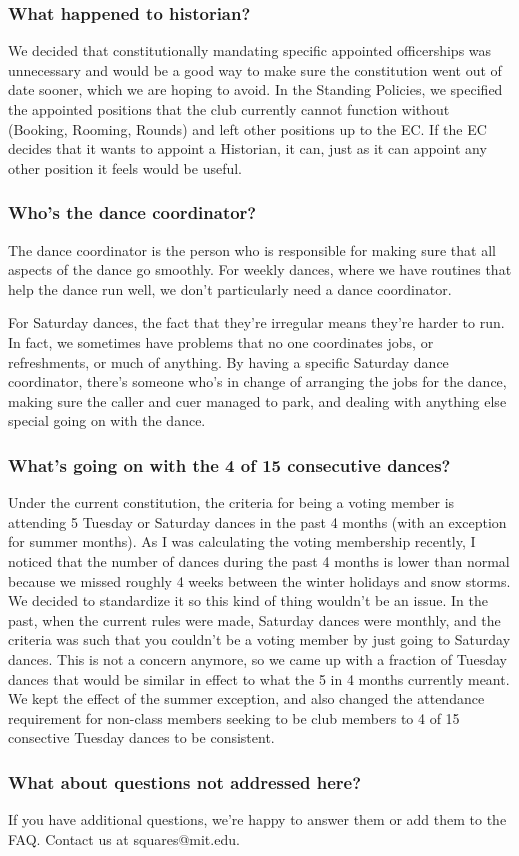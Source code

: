 \documentclass{article}
\begin{document}
\subsubsection*{What happened to historian?}
We decided that constitutionally mandating specific appointed officerships was unnecessary and would be a good way to make sure the constitution went out of date sooner, which we are hoping to avoid. In the Standing Policies, we specified the appointed positions that the club currently cannot function without (Booking, Rooming, Rounds) and left other positions up to the EC. If the EC decides that it wants to appoint a Historian, it can, just as it can appoint any other position it feels would be useful.

\subsubsection*{Who's the dance coordinator?}
The dance coordinator is the person who is responsible for making sure that all aspects of the dance go smoothly. For weekly dances, where we have routines that help the dance run well, we don't particularly need a dance coordinator.

For Saturday dances, the fact that they're irregular means they're harder to run. In fact, we sometimes have problems that no one coordinates jobs, or refreshments, or much of anything. By having a specific Saturday dance coordinator, there's someone who's in change of arranging the jobs for the dance, making sure the caller and cuer managed to park, and dealing with anything else special going on with the dance.

\subsubsection*{What's going on with the 4 of 15 consecutive dances?}
Under the current constitution, the criteria for being a voting member is attending 5 Tuesday or Saturday dances in the past 4 months (with an exception for summer months). As I was calculating the voting membership recently, I noticed that the number of dances during the past 4 months is lower than normal because we missed roughly 4 weeks between the winter holidays and snow storms. We decided to standardize it so this kind of thing wouldn't be an issue. In the past, when the current rules were made, Saturday dances were monthly, and the criteria was such that you couldn't be a voting member by just going to Saturday dances. This is not a concern anymore, so we came up with a fraction of Tuesday dances that would be similar in effect to what the 5 in 4 months currently meant. We kept the effect of the summer exception, and also changed the attendance requirement for non-class members seeking to be club members to 4 of 15 consective Tuesday dances to be consistent.

\subsubsection*{What about questions not addressed here?}
If you have additional questions, we're happy to answer them or add them to the FAQ. Contact us at squares@mit.edu.
\end{document}
